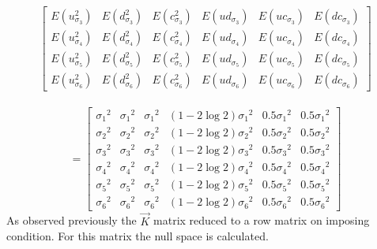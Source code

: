 \documentclass[12pt]{article}   	%
\begin{document}
\begin{enumerate}
$$\begin{bmatrix}
E(u_{\sigma_3}^2)& E(d_{\sigma_3}^2)& E(c_{\sigma_3}^2)&E(ud_{\sigma_3})&E(uc_{\sigma_3})&E(dc_{\sigma_3})\\
E(u_{\sigma_4}^2)& E(d_{\sigma_4}^2)& E(c_{\sigma_4}^2)&E(ud_{\sigma_4})&E(uc_{\sigma_4})&E(dc_{\sigma_4})\\
E(u_{\sigma_5}^2)& E(d_{\sigma_5}^2)& E(c_{\sigma_5}^2)&E(ud_{\sigma_5})&E(uc_{\sigma_5})&E(dc_{\sigma_5})\\
E(u_{\sigma_6}^2)& E(d_{\sigma_6}^2)& E(c_{\sigma_6}^2)&E(ud_{\sigma_6})&E(uc_{\sigma_6})&E(dc_{\sigma_6})
\end{bmatrix}$$\\
$$=\begin{bmatrix}
\sigma_1{^2} &\sigma_1{^2}&\sigma_1{^2} & (1-2\log 2)\sigma_1{^2} &0.5\sigma_1{^2} &0.5\sigma_1{^2}\\
\sigma_2{^2} &\sigma_2{^2}&\sigma_2{^2} & (1-2\log 2)\sigma_2{^2} &0.5\sigma_2{^2} &0.5\sigma_2{^2}\\
\sigma_3{^2} &\sigma_3{^2}&\sigma_3{^2} & (1-2\log 2)\sigma_3{^2} &0.5\sigma_3{^2} &0.5\sigma_3{^2}\\
\sigma_4{^2} &\sigma_4{^2}&\sigma_4{^2} & (1-2\log 2)\sigma_4{^2} &0.5\sigma_4{^2} &0.5\sigma_4{^2}\\
\sigma_5{^2} &\sigma_5{^2}&\sigma_5{^2} & (1-2\log 2)\sigma_5{^2} &0.5\sigma_5{^2} &0.5\sigma_5{^2}\\
\sigma_6{^2} &\sigma_6{^2}&\sigma_6{^2} & (1-2\log 2)\sigma_6{^2} &0.5\sigma_6{^2} &0.5\sigma_6{^2}
\end{bmatrix}$$
As observed previously the $\vec{K}$ matrix reduced to a row matrix on imposing condition. For this matrix the null space is calculated.


\end{enumerate}
\end{document}
